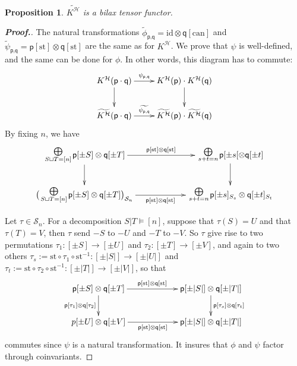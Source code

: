 \documentclass[11pt,reqno]{amsart}
\numberwithin{equation}{section}
\newtheorem{prop}[theorem]{Proposition}
\def\H{{\mathcal{H}}}
\def\p{{\textsf{p}}}
\def\q{{\textsf{q}}}
\def\KB{K^{\H}}
\def\KBt{\widetilde{K^{\H}}}
\def\pms{\pm s}
\def\pmt{\pm t}
\def\id{\mathrm{id}}
\def\can{\mathrm{can}}
\def\st{\mathrm{st}}
\def\can{\mathrm{can}}
\def\Sn{\mathbf{\mathcal{S}}_n}
\begin{document}
\begin{prop}
$\KBt$ is a bilax tensor functor.
\end{prop}
\begin{proof}[\bf Proof.] 
The natural transformations $\widetilde{\phi}_{\p,\q}=\id\otimes\q[\can]$ and $\widetilde{\psi}_{\p,\q}=\p[\st]\otimes\q[\st]$ are the same as for $\KB$. We prove that $\psi$ is well-defined, and the same can be done for $\phi$. In other words, this diagram has to commute:
\begin{equation}
\xymatrix{\KB(\p\cdot \q) \ar[d] \ar[r]^-{\psi_{\p,\q}}  &  \KB(\p)\cdot \KB(\q)\ar[d]\\
 \KBt(\p\cdot \q)\ar[r]^-{\widetilde{\psi_{\p,\q}}}  & \KBt(\p)\cdot \KBt(\q)}
\end{equation}
By fixing $n$, we have
\begin{equation}
\xymatrixcolsep{5pc}\xymatrix{ {\bigoplus \atop S\sqcup T=[n]} \p[\pm S]\otimes\q[\pm T] \ar[d] \ar[r]^-{\p[\st]\otimes\q[\st]}  &  {\bigoplus \atop s+t=n} \p[\pms[\otimes \q[\pmt]\ar[d]\\
\bigl{(}{\bigoplus \atop S\sqcup T=[n]} \p[\pm S]\otimes\q[\pm T]\bigr{)}_{\Sn} \ar[r]_-{\p[\st]\otimes \q[\st]} & {\bigoplus \atop s+t=n} \p[\pms]_{S_s} \otimes \q[\pmt]_{S_t}}
\end{equation}

Let $\tau\in \Sn$. For a decomposition $S|T\models [n]$, suppose that $\tau(S)=U$ and that $\tau(T)=V$, then $\tau$ send $-S$ to $-U$ and $-T$ to $-V$. So $\tau$ give rise to two permutations $\tau_1\colon [\pm S]\rightarrow [\pm U]$ and $\tau_2\colon [\pm T]\rightarrow [\pm V]$, and again to two others $\tau_s:=\st\circ\tau_1\circ \st^{-1}\colon [\pm |S|]\rightarrow [\pm |U|]$ and $\tau_t:=\st\circ\tau_2\circ\st^{-1}\colon [\pm |T|]\rightarrow [\pm |V|]$, so that
\begin{equation}
\xymatrixcolsep{5pc}\xymatrix{ \p[\pm S]\otimes\q[\pm T] \ar[d]_{\p[\tau_1]\otimes \q[\tau_2]} \ar[r]^-{\p[\st]\otimes\q[\st]}  &  \p[\pm |S| ]\otimes \q [\pm |T|]      \ar[d]^{\p[\tau_s]\otimes\q[\tau_t]} \\
p[\pm U]\otimes\q[\pm V] \ar[r]_-{\p[\st]\otimes \q[\st]} & \p[\pm |S|] \otimes \q[\pm |T|]}
\end{equation}
commutes since $\psi$ is a natural transformation. It insures that $\phi$ and $\psi$ factor through coinvariants.
\end{proof}
\end{document}
